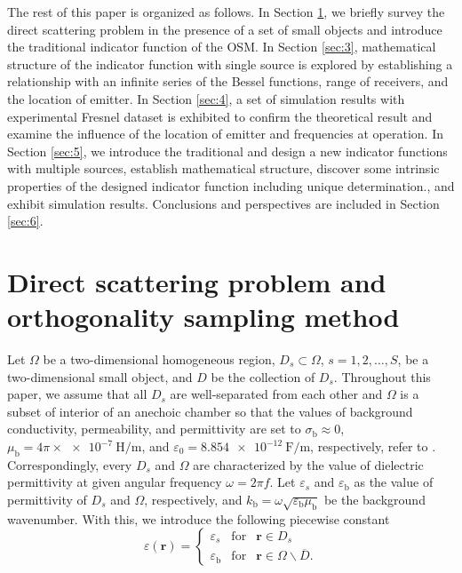 \documentclass[3p,10pt]{elsarticle}
\newcommand{\eps}{\varepsilon}
\newcommand{\kb}{k_{\mathrm{b}}}
\newcommand{\epsb}{\varepsilon_{\mathrm{b}}}
\newcommand{\mub}{\mu_{\mathrm{b}}}
\newcommand{\sigmab}{\sigma_{\mathrm{b}}}
\newcommand{\mr}{\mathbf{r}}
\theoremstyle{plain}
\theoremstyle{remark}
\begin{document}
The rest of this paper is organized as follows. In Section \ref{sec:2}, we briefly survey the direct scattering problem in the presence of a set of small objects and introduce the traditional indicator function of the OSM. In Section \ref{sec:3},  mathematical structure of the indicator function with single source is explored by establishing a relationship with an infinite series of the Bessel functions, range of receivers, and the location of emitter. In Section \ref{sec:4}, a set of simulation results with experimental Fresnel dataset is exhibited to confirm the theoretical result and examine the influence of the location of emitter and frequencies at operation. In Section \ref{sec:5}, we introduce the traditional and design a new indicator functions with multiple sources, establish mathematical structure, discover some intrinsic properties of the designed indicator function including unique determination., and exhibit simulation results. Conclusions and perspectives are included in Section \ref{sec:6}.

\section{Direct scattering problem and orthogonality sampling method}\label{sec:2}
Let $\Omega$ be a two-dimensional homogeneous region, $D_s\subset\Omega$, $s=1,2,\ldots,S$, be a two-dimensional small object, and $D$ be the collection of $D_s$. Throughout this paper, we assume that all $D_s$ are well-separated from each other and $\Omega$ is a subset of interior of an anechoic chamber so that the values of background conductivity, permeability, and permittivity are set to $\sigmab\approx0$, $\mub=4\pi\times \SI{e-7}{\henry/\meter}$, and $\eps_0=\SI{8.854e-12}{\farad/\meter}$, respectively, refer to \cite{P-Book}. Correspondingly, every $D_s$ and $\Omega$ are characterized by the value of dielectric permittivity at given angular frequency $\omega=2\pi f$. Let $\eps_s$ and $\epsb$ as the value of permittivity of $D_s$ and $\Omega$, respectively, and $\kb=\omega\sqrt{\epsb\mub}$ be the background wavenumber. With this, we introduce the following piecewise constant
\[\eps(\mr)=\left\{\begin{array}{ccl}
\eps_s&\text{for}&\mr\in D_s\\
\epsb&\text{for}&\mr\in\Omega\backslash\overline{D}.
\end{array}\right.\]
\end{document}
